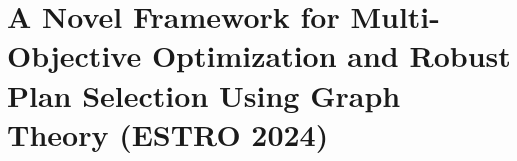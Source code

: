 

\section[Novel Dosimetry Automation Approach with Graph Theory]{A Novel Framework for Multi-Objective Optimization and Robust Plan Selection Using Graph Theory (ESTRO 2024)}

